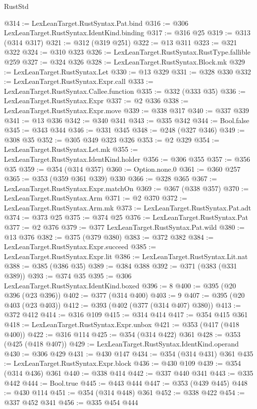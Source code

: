 \begin{lexlean}{RustStd}
\begin{coremodule}
@314 := LexLeanTarget.RustSyntax.Pat.bind
@316 := @306 LexLeanTarget.RustSyntax.IdentKind.binding
@317 := @316 @25
@319 := @313 (@314 @317)
@321 := @312 (@319 @251)
@322 := @13 @311
@323 := @321 @322
@324 := @310 @323
@326 := LexLeanTarget.RustSyntax.RustType.fallible @259
@327 := @324 @326
@328 := LexLeanTarget.RustSyntax.Block.mk
@329 := LexLeanTarget.RustSyntax.Let
@330 := @13 @329
@331 := @328 @330
@332 := LexLeanTarget.RustSyntax.Expr.call
@333 := LexLeanTarget.RustSyntax.Callee.function
@335 := @332 (@333 @35)
@336 := LexLeanTarget.RustSyntax.Expr
@337 := @2 @336
@338 := LexLeanTarget.RustSyntax.Expr.move
@339 := @338 @317
@340 := @337 @339
@341 := @13 @336
@342 := @340 @341
@343 := @335 @342
@344 := Bool.false
@345 := @343 @344
@346 := @331 @345
@348 := @248 (@327 @346)
@349 := @308 @35
@352 := @305 @349 @323 @326
@353 := @2 @329
@354 := LexLeanTarget.RustSyntax.Let.mk
@355 := LexLeanTarget.RustSyntax.IdentKind.holder
@356 := @306 @355
@357 := @356 @35
@359 := @354 (@314 @357)
@360 := Option.none.{0}
@361 := @360 @257
@365 := @353 (@359 @361 @339) @330
@366 := @328 @365
@367 := LexLeanTarget.RustSyntax.Expr.matchOn
@369 := @367 (@338 @357)
@370 := LexLeanTarget.RustSyntax.Arm
@371 := @2 @370
@372 := LexLeanTarget.RustSyntax.Arm.mk
@373 := LexLeanTarget.RustSyntax.Pat.adt
@374 := @373 @25
@375 := @374 @25
@376 := LexLeanTarget.RustSyntax.Pat
@377 := @2 @376
@379 := @377 LexLeanTarget.RustSyntax.Pat.wild
@380 := @13 @376
@382 := @375 (@379 @380)
@383 := @372 @382
@384 := LexLeanTarget.RustSyntax.Expr.succeed
@385 := LexLeanTarget.RustSyntax.Expr.lit
@386 := LexLeanTarget.RustSyntax.Lit.nat
@388 := @385 (@386 @35)
@389 := @384 @388
@392 := @371 (@383 (@331 @389))
@393 := @374 @35
@395 := @306 LexLeanTarget.RustSyntax.IdentKind.boxed
@396 := 8
@400 := @395 (@20 @396 (@23 @396))
@402 := @377 (@314 @400)
@403 := 9
@407 := @395 (@20 @403 (@23 @403))
@412 := @393 (@402 (@377 (@314 @407) @380))
@413 := @372 @412
@414 := @316 @109
@415 := @314 @414
@417 := @354 @415 @361
@418 := LexLeanTarget.RustSyntax.Expr.unbox
@421 := @353 (@417 (@418 @400))
@422 := @316 @114
@425 := @354 (@314 @422) @361
@428 := @353 (@425 (@418 @407))
@429 := LexLeanTarget.RustSyntax.IdentKind.operand
@430 := @306 @429
@431 := @430 @147
@434 := @354 (@314 @431) @361
@435 := LexLeanTarget.RustSyntax.Expr.block
@436 := @430 @109
@439 := @354 (@314 @436) @361
@440 := @338 @414
@442 := @337 @440 @341
@443 := @335 @442
@444 := Bool.true
@445 := @443 @444
@447 := @353 (@439 @445)
@448 := @430 @114
@451 := @354 (@314 @448) @361
@452 := @338 @422
@454 := @337 @452 @341
@456 := @335 @454 @444

\end{coremodule}
\end{lexlean}
